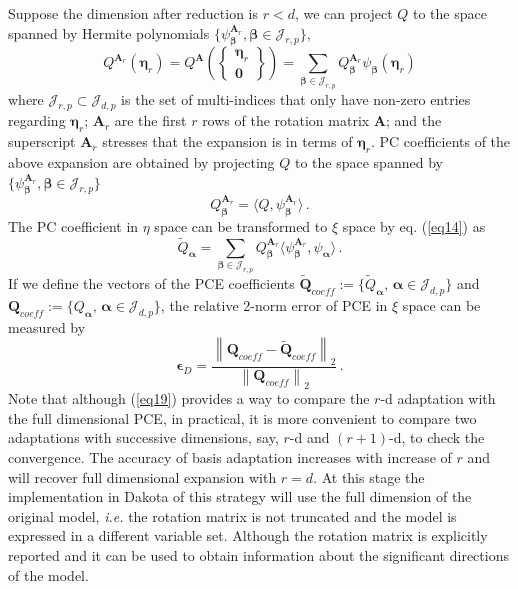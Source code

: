 Suppose the dimension after reduction is $r<d$, we can project $Q$ to the space spanned by Hermite polynomials $\{ \psi_{ \bm{\beta} }^{ \bm{A}_r }, \bm\beta \in \mathcal{J}_{r,p}\}$,
\begin{equation}
\label{eq10}
{Q}^{\bm{A}_r}(\bm{\eta}_r)
= {Q}^{\bm{A}}\left(\begin{Bmatrix} \bm{\eta}_r \\ \bm{0} \end{Bmatrix}\right)
= \sum_{\bm{\beta}\in\mathcal{J}_{r,p}} Q_{\bm{\beta}}^{\bm{A}_r} \psi_{\bm{\beta}}(\bm{\eta}_r)
\end{equation}
where $\mathcal{J}_{r,p}\subset\mathcal{J}_{d,p}$ is the set of multi-indices that only have non-zero entries regarding $\bm{\eta}_r$; $\bm{A}_r$ are the first $r$ rows of the rotation matrix $\bm{A}$; and the superscript $\bm{A}_r$ stresses that the expansion is in terms of $\bm{\eta}_r$. PC coefficients of the above expansion are obtained by projecting $Q$ to the space spanned by $\{\psi_{\bm{\beta}}^{\bm{A}_r}, \bm\beta \in \mathcal{J}_{r,p}\}$
\begin{equation}
\label{eq11}
Q_{\bm{\beta}}^{\bm{A}_r} = \langle Q, \psi_{ \bm{\beta}}^{\bm{A}_r} \rangle\,.
\end{equation}
The PC coefficient in $\eta$ space can be transformed to $\xi$ space by eq. (\ref{eq14}) as
\begin{equation}
\tilde{Q}_{\bm{\alpha}} = \sum_{\bm{\beta}\in\mathcal{J}_{r,p}} Q_{\bm{\beta}}^{\bm{A}_r} \langle \psi_{\bm{\beta}}^{\bm{A}_r}, \psi_{\bm \alpha} \rangle\,.
\end{equation}
If we define the vectors of the PCE coefficients $\tilde{\bm{Q}}_{coeff} := \{\tilde{Q}_{\bm{\alpha}},\, \bm{\alpha}\in\mathcal{J}_{d,p}\}$ and $\bm{Q}_{coeff} := \{Q_{\bm{\alpha}},\, \bm{\alpha}\in\mathcal{J}_{d,p}\}$, the relative 2-norm error of PCE in $\xi$ space can be measured by
\begin{equation}
\label{eq19}
\bm{\epsilon}_D = \frac{\left\| \bm{Q}_{coeff} - \tilde{\bm{Q}}_{coeff} \right\|_2} {\left\| \bm{Q}_{coeff} \right\|_2} \,.
\end{equation}
Note that although (\ref{eq19}) provides a way to compare the $r$-d adaptation with the full dimensional PCE, in practical, it is more convenient to compare two adaptations with successive dimensions, say, $r$-d and $(r+1)$-d, to check the convergence. The accuracy of basis adaptation increases with increase of $r$ and will recover full dimensional expansion with $r=d$. At this stage the implementation in Dakota of this strategy will use the full dimension of the original model, \textit{i.e.} the rotation matrix is not truncated and the model is expressed in a different variable set. Although the rotation matrix is explicitly reported and it can be used to obtain information about the significant directions of the model. 

